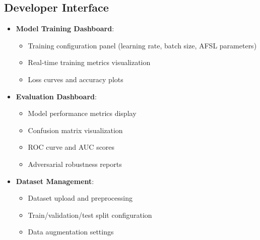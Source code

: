 \documentclass[a4paper,12pt]{article}
\begin{document}
\subsection{Developer Interface}
\begin{itemize}
    \item \textbf{Model Training Dashboard}:
    \begin{itemize}
        \item Training configuration panel (learning rate, batch size, AFSL parameters)
        \item Real-time training metrics visualization
        \item Loss curves and accuracy plots
    \end{itemize}
    
    \item \textbf{Evaluation Dashboard}:
    \begin{itemize}
        \item Model performance metrics display
        \item Confusion matrix visualization
        \item ROC curve and AUC scores
        \item Adversarial robustness reports
    \end{itemize}
    
    \item \textbf{Dataset Management}:
    \begin{itemize}
        \item Dataset upload and preprocessing
        \item Train/validation/test split configuration
        \item Data augmentation settings
    \end{itemize}
\end{itemize}
\end{document}
